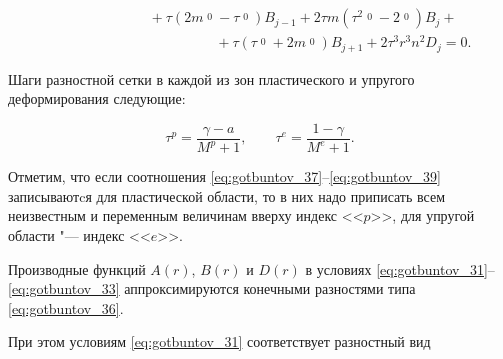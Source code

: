 \begin{equation}
\begin{array}{l}
\\

\hspace{3cm}

+\tau (2m\mathop{\xi_{14}}\limits^{0}-\tau\mathop{\xi_{15}}\limits^{0} )B_{j-1}+

2\tau m (\tau^2\mathop{\xi_{11}}\limits^{0}-2\mathop{\xi_{14}}\limits^{0})B_j+

\\

\hspace{5cm}

+\tau (\tau\mathop{\xi_{15}}\limits^{0}+2m\mathop{\xi_{14}}\limits^{0} )B_{j+1}+2\tau^3r^3n^2D_j=0. 

\end{array}

\label{eq:gotbuntov_39}

\end{equation}



Шаги разностной сетки в каждой из зон пластического и упругого деформирования следующие:

\begin{equation}

\tau^p=\frac{\gamma-a}{M^p+1}, \qquad \tau^e=\frac{1-\gamma}{M^e+1}.

\label{eq:gotbuntov_40}

\end{equation}                            



Отметим, что если соотношения \eqref{eq:gotbuntov_37}--\eqref{eq:gotbuntov_39} записываютcя для пластической области, то в них надо приписать всем неизвестным и переменным величинам вверху индекс <<$p$>>, для упругой области "--- индекс <<$e$>>.



Производные функций $A(r)$, $B(r)$ и $D(r)$ в условиях \eqref{eq:gotbuntov_31}--\eqref{eq:gotbuntov_33} аппроксимируются конечными разностями типа \eqref{eq:gotbuntov_36}. 

При этом условиям \eqref{eq:gotbuntov_31} соответствует разностный вид

